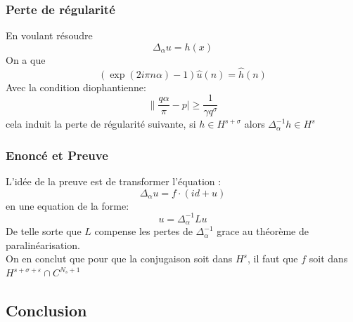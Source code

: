 \documentclass[10pt]{beamer}
\begin{document}
\begin{frame}
\frametitle{Perte de régularité}
En voulant résoudre
$$ \Delta_\alpha u = h (x) $$
On a que 
\[ (\exp(2 i \pi n \alpha)-1)\widehat{u} (n) = \widehat{h} (n) \]
Avec la condition diophantienne:
$$ \|\frac{q \alpha}{\pi}-p|\geq \frac{1}{\gamma q^\sigma}$$
cela induit la perte de régularité suivante, si $h \in H^{s+\sigma}$ alors $\Delta_\alpha^{-1}h \in H^{s}$


\end{frame}


\begin{frame}
\frametitle{Enoncé et Preuve}
L'idée de la preuve est de transformer l'équation  :
$$ \Delta_\alpha u= f \cdot (id +u)$$
en une equation de la forme:
$$u = \Delta_\alpha^{-1} Lu$$
De telle sorte que $L$ compense les pertes de $\Delta_\alpha^{-1}$ grace au théorème de paralinéarisation.
\\
On en conclut que pour que la conjugaison soit dans $H^s$, il faut que $f$ soit dans $H^{s+\sigma + \varepsilon}\cap C^{N_s+1}$
\end{frame}


\begin{frame}
\section{Conclusion}
\end{frame}
\end{document}
